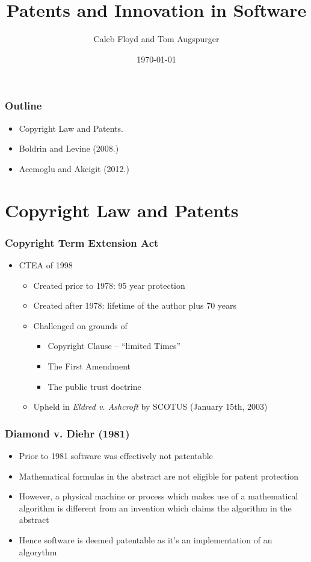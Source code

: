 \documentclass{beamer}
\title{Patents and Innovation in Software}
\author{Caleb Floyd and Tom Augspurger}
\date{\today}
\begin{document}
\begin{frame}[t]\frametitle{Outline}
    
\begin{itemize}
  \item Copyright Law and Patents.
  \item Boldrin and Levine (2008.)
  \item Acemoglu and Akcigit (2012.)
\end{itemize}

\end{frame}

\section{Copyright Law and Patents}
\label{sec:copyright_law_and_patents}

\begin{frame}[t]
    \frametitle{Copyright Term Extension Act}
  \begin{itemize}
    \item<+-> CTEA of 1998
      \begin{itemize}
        \item<+-> Created prior to 1978: 95 year protection
        \item<+-> Created after 1978: lifetime of the author plus 70 years
        \item<+-> Challenged on grounds of
        \begin{itemize}
            \item<+-> Copyright Clause -- ``limited Times''
            \item<+-> The First Amendment
            \item<+-> The public trust doctrine
        \end{itemize}
        \item<+-> Upheld in \emph{Eldred v. Ashcroft} by SCOTUS (January 15th, 2003)
    \end{itemize}
  \end{itemize}
\end{frame}

\begin{frame}[t]
 \frametitle{Diamond v. Diehr (1981)}
 \begin{itemize}
     \item<+-> Prior to 1981 software was effectively not patentable 
     \item<+-> Mathematical formulas in the abstract are not eligible for patent protection
     \item<+-> However, a physical machine or process which makes use of a mathematical algorithm is different from an invention which claims the algorithm in the abstract
     \item<+-> Hence software is deemed patentable as it's an implementation of an algorythm
 \end{itemize}
\end{frame}
\end{document}
